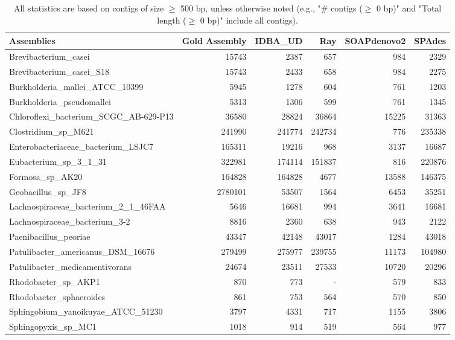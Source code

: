 \documentclass[12pt,a4paper]{article}
\begin{document}
\begin{table}[ht]
\begin{center}
\caption{All statistics are based on contigs of size $\geq$ 500 bp, unless otherwise noted (e.g., "\# contigs ($\geq$ 0 bp)" and "Total length ($\geq$ 0 bp)" include all contigs).}
\begin{tabular}{|l*{5}{|r}|}
\hline
Assemblies & Gold Assembly & IDBA_UD & Ray & SOAPdenovo2 & SPAdes \\ \hline
Brevibacterium\_casei & 15743 & 2387 & 657 & 984 & 2329 \\ \hline
Brevibacterium\_casei\_S18 & 15743 & 2433 & 658 & 984 & 2275 \\ \hline
Burkholderia\_mallei\_ATCC\_10399 & 5945 & 1278 & 604 & 761 & 1203 \\ \hline
Burkholderia\_pseudomallei & 5313 & 1306 & 599 & 761 & 1345 \\ \hline
Chloroflexi\_bacterium\_SCGC\_AB-629-P13 & 36580 & 28824 & 36864 & 15225 & 31363 \\ \hline
Clostridium\_sp\_M621 & 241990 & 241774 & 242734 & 776 & 235338 \\ \hline
Enterobacteriaceae\_bacterium\_LSJC7 & 165311 & 19216 & 968 & 3137 & 16687 \\ \hline
Eubacterium\_sp\_3\_1\_31 & 322981 & 174114 & 151837 & 816 & 220876 \\ \hline
Formosa\_sp\_AK20 & 164828 & 164828 & 4677 & 13588 & 146375 \\ \hline
Geobacillus\_sp\_JF8 & 2780101 & 53507 & 1564 & 6453 & 35251 \\ \hline
Lachnospiraceae\_bacterium\_2\_1\_46FAA & 5646 & 16681 & 994 & 3641 & 16681 \\ \hline
Lachnospiraceae\_bacterium\_3-2 & 8816 & 2360 & 638 & 943 & 2122 \\ \hline
Paenibacillus\_peoriae & 43347 & 42148 & 43017 & 1284 & 43018 \\ \hline
Patulibacter\_americanus\_DSM\_16676 & 279499 & 275977 & 239755 & 11173 & 104980 \\ \hline
Patulibacter\_medicamentivorans & 24674 & 23511 & 27533 & 10720 & 20296 \\ \hline
Rhodobacter\_sp\_AKP1 & 870 & 773 & - & 579 & 833 \\ \hline
Rhodobacter\_sphaeroides & 861 & 753 & 564 & 570 & 850 \\ \hline
Sphingobium\_yanoikuyae\_ATCC\_51230 & 3797 & 4331 & 717 & 1155 & 3806 \\ \hline
Sphingopyxis\_sp\_MC1 & 1018 & 914 & 519 & 564 & 977 \\ \hline

\end{tabular}
\end{center}
\end{table}
\end{document}

